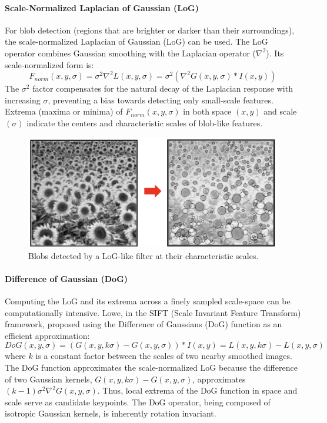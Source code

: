 \paragraph{Scale-Normalized Laplacian of Gaussian (LoG)}
For blob detection (regions that are brighter or darker than their surroundings), the scale-normalized Laplacian of Gaussian (LoG) can be used. The LoG operator combines Gaussian smoothing with the Laplacian operator ($\nabla^2$). Its scale-normalized form is:
\[ F_{norm}(x,y,\sigma) = \sigma^2 \nabla^2 L(x,y,\sigma) = \sigma^2 (\nabla^2 G(x,y,\sigma) * I(x,y)) \]
The $\sigma^2$ factor compensates for the natural decay of the Laplacian response with increasing $\sigma$, preventing a bias towards detecting only small-scale features. Extrema (maxima or minima) of $F_{norm}(x,y,\sigma)$ in both space $(x,y)$ and scale $(\sigma)$ indicate the centers and characteristic scales of blob-like features.

\begin{figure}[htbp]
  \centering
  \includegraphics[width=0.7\linewidth]{./img/sunflower_blobs.jpg}
  \caption{Blobs detected by a LoG-like filter at their characteristic scales.}
  \label{fig:sunflower_blobs}
\end{figure}

\paragraph{Difference of Gaussian (DoG)}
Computing the LoG and its extrema across a finely sampled scale-space can be computationally intensive. Lowe, in the SIFT (Scale Invariant Feature Transform) framework, proposed using the Difference of Gaussians (DoG) function as an efficient approximation:
\[ DoG(x,y,\sigma) = (G(x,y,k\sigma) - G(x,y,\sigma)) * I(x,y) = L(x,y,k\sigma) - L(x,y,\sigma) \]
where $k$ is a constant factor between the scales of two nearby smoothed images. The DoG function approximates the scale-normalized LoG because the difference of two Gaussian kernels, $G(x,y,k\sigma) - G(x,y,\sigma)$, approximates $(k-1)\sigma^2 \nabla^2 G(x,y,\sigma)$. Thus, local extrema of the DoG function in space and scale serve as candidate keypoints. The DoG operator, being composed of isotropic Gaussian kernels, is inherently rotation invariant.


